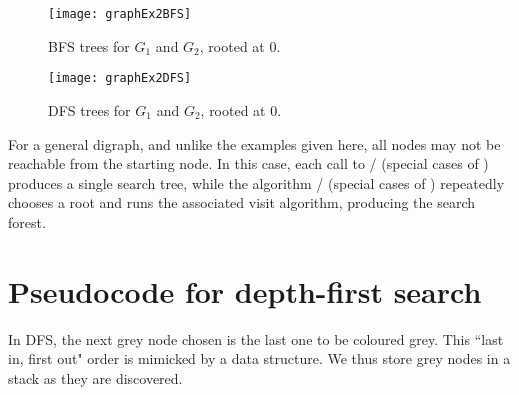 \begin{figure}[hbtp]
	\centering
	\texttt{[image: graphEx2BFS]}
	\caption{BFS trees for $G_1$ and $G_2$, rooted at $0$.}
	\label{fig:graphEx2-BFS}
\end{figure}

\begin{figure}[hbtp]
	\centering 
	\texttt{[image: graphEx2DFS]}
	\caption{DFS trees for $G_1$ and $G_2$, rooted at $0$.}
	\label{fig:graphEx2-DFS}
\end{figure}

For a general digraph, and unlike the examples given here, all nodes may not be reachable from the starting node. In this case, each call to
/ (special cases of ) produces a single search tree, while the algorithm / (special cases of ) repeatedly chooses a root and runs the associated visit algorithm, producing the search forest.

%
%
%

\section{Pseudocode for depth-first search}
\label{ss: DFS}

In DFS, the next grey node chosen is the last one to be coloured grey. 
This ``last in, first
out" order is mimicked  by a  data structure. We thus store grey nodes in a stack as they are discovered. 

